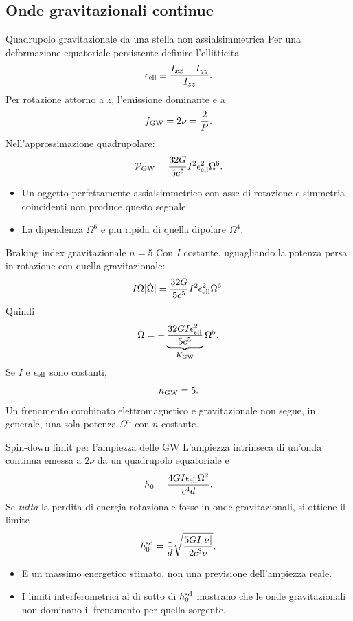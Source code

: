 \subsection{Onde gravitazionali continue}

\begin{frame}[t]{Quadrupolo gravitazionale da una stella non assialsimmetrica}
\small
Per una deformazione equatoriale persistente definire l'ellitticita
\[
\epsilon_{\rm ell}\equiv\frac{I_{xx}-I_{yy}}{I_{zz}}.
\]
Per rotazione attorno a $z$, l'emissione dominante e a
\[
f_{\rm GW}=2\nu=\frac2P.
\]
Nell'approssimazione quadrupolare:
\[
\mathcal P_{\rm GW}=\frac{32G}{5c^5}I^2\epsilon_{\rm ell}^2\Omega^6.
\]
\begin{itemize}
\item Un oggetto perfettamente assialsimmetrico con asse di rotazione e simmetria coincidenti non produce questo segnale.
\item La dipendenza $\Omega^6$ e piu ripida di quella dipolare $\Omega^4$.
\end{itemize}
\end{frame}

\begin{frame}[t]{Braking index gravitazionale $n=5$}
\small
Con $I$ costante, uguagliando la potenza persa in rotazione con quella gravitazionale:
\[
I\Omega|\dot\Omega|=\frac{32G}{5c^5}I^2\epsilon_{\rm ell}^2\Omega^6.
\]
Quindi
\[
\dot\Omega=-\underbrace{\frac{32GI\epsilon_{\rm ell}^2}{5c^5}}_{K_{\rm GW}}\Omega^5.
\]
Se $I$ e $\epsilon_{\rm ell}$ sono costanti,
\[
n_{\rm GW}=5.
\]
Un frenamento combinato elettromagnetico e gravitazionale non segue, in generale, una sola potenza $\Omega^n$ con $n$ costante.
\end{frame}

\begin{frame}[t]{Spin-down limit per l'ampiezza delle GW}
\small
L'ampiezza intrinseca di un'onda continua emessa a $2\nu$ da un quadrupolo equatoriale e
\[
h_0=\frac{4GI\epsilon_{\rm ell}\Omega^2}{c^4d}.
\]
Se \emph{tutta} la perdita di energia rotazionale fosse in onde gravitazionali, si ottiene il limite
\[
h_0^{\rm sd}=\frac1d\sqrt{\frac{5GI|\dot\nu|}{2c^3\nu}}.
\]
\begin{itemize}
\item E un massimo energetico stimato, non una previsione dell'ampiezza reale.
\item I limiti interferometrici al di sotto di $h_0^{\rm sd}$ mostrano che le onde gravitazionali non dominano il frenamento per quella sorgente.
\end{itemize}
\end{frame}

